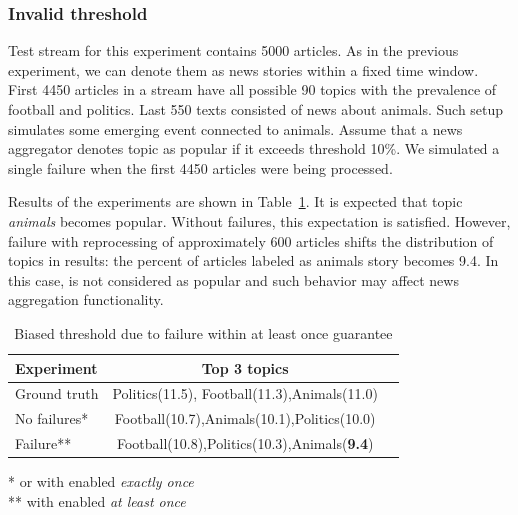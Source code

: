 \subsubsection{Invalid threshold}


Test stream for this experiment contains 5000 articles. As in the previous experiment, we can denote them as news stories within a fixed time window. First 4450 articles in a stream have all possible 90 topics with the prevalence of football and politics. Last 550 texts consisted of news about animals. Such setup simulates some emerging event connected to animals. Assume that a news aggregator denotes topic as popular if it exceeds threshold 10\%. We simulated a single failure when the first 4450 articles were being processed.

Results of the experiments are shown in Table~\ref{biased_threshold}. It is expected that topic {\em animals} becomes popular. Without failures, this expectation is satisfied. However, failure with reprocessing of approximately 600 articles shifts the distribution of topics in results: the percent of articles labeled as animals story becomes 9.4. In this case, is not considered as popular and such behavior may affect news aggregation functionality.

\begin{table}[htbp]
\caption{Biased threshold due to failure within at least once guarantee}
\begin{threeparttable}
\begin{tabular}{lcl}
Experiment    & Top 3 topics    \\
\hline
Ground truth   &   Politics(11.5), Football(11.3),Animals(11.0)    \\
No failures*   &   Football(10.7),Animals(10.1),Politics(10.0)    \\
Failure**   &   Football(10.8),Politics(10.3),Animals({\bf 9.4})    \\
\end{tabular}
* or with enabled {\em exactly once} \\
** with enabled {\em at least once}
\end{threeparttable}
\label{biased_threshold}
\end{table}


